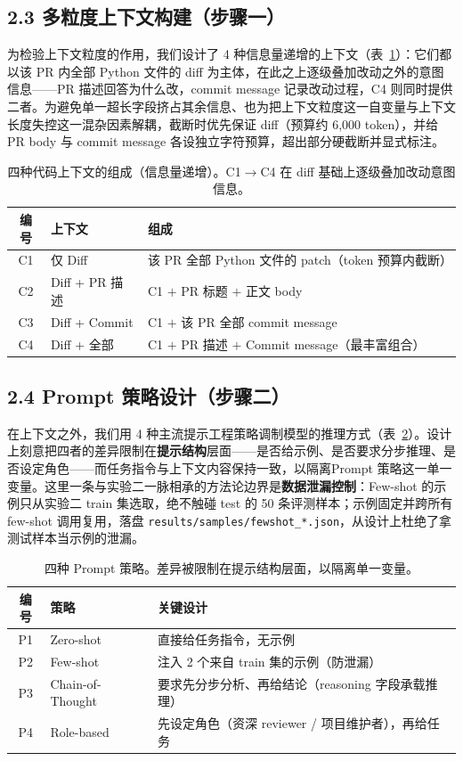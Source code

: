 \documentclass{experimentreport}
\begin{document}
{\subsection*{2.3 多粒度上下文构建（步骤一）}

为检验上下文粒度的作用，我们设计了 4 种信息量递增的上下文（表~\ref{tab:context}）：它们都以该 PR 内全部 Python 文件的 diff 为主体，在此之上逐级叠加改动之外的意图信息——PR 描述回答为什么改，commit message 记录改动过程，C4 则同时提供二者。为避免单一超长字段挤占其余信息、也为把上下文粒度这一自变量与上下文长度失控这一混杂因素解耦，截断时优先保证 diff（预算约 6{,}000 token），并给 PR body 与 commit message 各设独立字符预算，超出部分硬截断并显式标注。

\begin{table}[H]
\centering
\caption{四种代码上下文的组成（信息量递增）。C1$\rightarrow$C4 在 diff 基础上逐级叠加改动意图信息。}
\label{tab:context}
\small
\begin{tabularx}{\textwidth}{c l X}
\toprule
编号 & 上下文 & 组成 \\
\midrule
C1 & 仅 Diff & 该 PR 全部 Python 文件的 patch（token 预算内截断） \\
C2 & Diff + PR 描述 & C1 $+$ PR 标题 $+$ 正文 body \\
C3 & Diff + Commit & C1 $+$ 该 PR 全部 commit message \\
C4 & Diff + 全部 & C1 $+$ PR 描述 $+$ Commit message（最丰富组合） \\
\bottomrule
\end{tabularx}
\end{table}

\subsection*{2.4 Prompt 策略设计（步骤二）}

在上下文之外，我们用 4 种主流提示工程策略调制模型的推理方式（表~\ref{tab:prompt}）。设计上刻意把四者的差异限制在\textbf{提示结构}层面——是否给示例、是否要求分步推理、是否设定角色——而任务指令与上下文内容保持一致，以隔离Prompt 策略这一单一变量。这里一条与实验二一脉相承的方法论边界是\textbf{数据泄漏控制}：Few-shot 的示例只从实验二 train 集选取，绝不触碰 test 的 50 条评测样本；示例固定并跨所有 few-shot 调用复用，落盘 \texttt{results/samples/fewshot\_*.json}，从设计上杜绝了拿测试样本当示例的泄漏。

\begin{table}[H]
\centering
\caption{四种 Prompt 策略。差异被限制在提示结构层面，以隔离单一变量。}
\label{tab:prompt}
\small
\begin{tabularx}{\textwidth}{c l X}
\toprule
编号 & 策略 & 关键设计 \\
\midrule
P1 & Zero-shot & 直接给任务指令，无示例 \\
P2 & Few-shot & 注入 2 个来自 train 集的示例（防泄漏） \\
P3 & Chain-of-Thought & 要求先分步分析、再给结论（reasoning 字段承载推理） \\
P4 & Role-based & 先设定角色（资深 reviewer / 项目维护者），再给任务 \\
\bottomrule
\end{tabularx}
\end{table}

}
\end{document}
